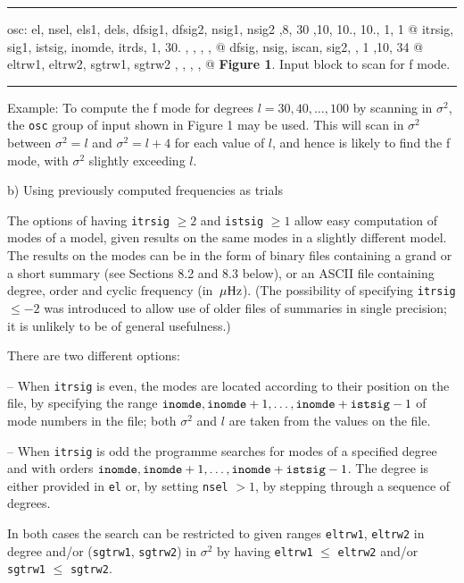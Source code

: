 
\smallskip
\hrule
\medskip
{
\obeyspaces
\source
osc:
  el, nsel, els1, dels, dfsig1, dfsig2, nsig1, nsig2
    ,8,  30  ,10,   10.,    10.,   1,    1     @
  itrsig, sig1, istsig, inomde, itrds,
    1,    30. ,     ,      ,     ,       @
  dfsig, nsig, iscan, sig2,
      ,   1   ,10,  34     @
eltrw1, eltrw2, sgtrw1, sgtrw2
    ,        ,      ,        ,    @
}
\msni
{\bf Figure 1}. Input block to scan for f mode.
\medskip
\hrule
\smallskip
\gif

\medskip\noindent
Example:
To compute the f mode for degrees $l = 30, 40, \ldots, 100$
by scanning in $\sigma^2$, 
the {\tt osc} group of input shown in Figure 1 may be used.
This will scan in $\sigma^2$ between $\sigma^2 = l$ and $\sigma^2 = l+4$
for each value of $l$, and hence is likely to find the f mode,
with $\sigma^2$ slightly exceeding $l$.

\subsect
{b) Using previously computed frequencies as trials}

The options of having {\tt itrsig} $\ge 2$
and {\tt istsig} $\ge 1$ allow easy computation of modes
of a model, given results on the same modes in a slightly different model. 
The results on the modes can be in the form of binary files 
containing a grand or a short summary 
(see Sections 8.2 and 8.3 below),
or an ASCII file containing degree, order and cyclic frequency (in $\,\mu{\rm Hz}$).
(The possibility of specifying {\tt itrsig} $\le -2$ was
introduced to allow use of older files of summaries in
single precision; it is unlikely to be of general usefulness.)

There are two different options:
\medskip
\item{--} When {\tt itrsig} is even,
the modes are located according to their position on the file,
by specifying the range 
${\tt inomde}, {\tt inomde} + 1, \ldots, {\tt inomde} + {\tt istsig} - 1$ 
of mode numbers in the file;
both $\sigma^2$ and $l$ are taken from the values on the file.

\item{--}
When {\tt itrsig} is odd the
programme searches for modes of a specified degree and with orders
${\tt inomde}, {\tt inomde} + 1, \ldots, {\tt inomde} + {\tt istsig} - 1$.
The degree is either provided in {\tt el} or, by setting {\tt nsel} $> 1$,
by stepping through a sequence of degrees.

\medskip
In both cases the search can be restricted to given ranges
{\tt eltrw1}, {\tt eltrw2} in degree and/or
({\tt sgtrw1}, {\tt sgtrw2}) in $\sigma^2$ by having
{\tt eltrw1} $\le$ {\tt eltrw2} and/or {\tt sgtrw1} $\le$ {\tt sgtrw2}.

